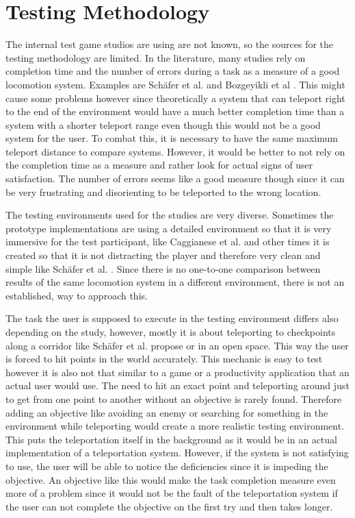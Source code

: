 \section{Testing Methodology}
The internal test game studios are using are not known, so the sources for the testing methodology are limited. In the literature, many studies rely on completion time and the number of errors during a task as a measure of a good locomotion system. Examples are Schäfer et al. \cite{Schafer2021} and Bozgeyikli et al \cite{bozgeyikli}.
This might cause some problems however since theoretically a system that can teleport right to the end of the environment would have a much better completion time than a system with a shorter teleport range even though this would not be a good system for the user. To combat this, it is necessary to have the same maximum teleport distance to compare systems. However, it would be better to not rely on the completion time as a measure and rather look for actual signs of user satisfaction. The number of errors seems like a good measure though since it can be very frustrating and disorienting to be teleported to the wrong location. 

The testing environments used for the studies are very diverse. Sometimes the prototype implementations are using a detailed environment so that it is very immersive for the test participant, like Caggianese et al. \cite{Caggianese} and other times it is created so that it is not distracting the player and therefore very clean and simple like Schäfer et al. \cite{Schafer2021}.  
Since there is no one-to-one comparison between results of the same locomotion system in a different environment, there is not an established, way to approach this.

The task the user is supposed to execute in the testing environment differs also depending on the study, however, mostly it is about teleporting to checkpoints along a corridor like Schäfer et al. \cite{Schafer2021} propose or in an open space.
This way the user is forced to hit points in the world accurately. This mechanic is easy to test however it is also not that similar to a game or a productivity application that an actual user would use. The need to hit an exact point and teleporting around just to get from one point to another without an objective is rarely found. Therefore adding an objective like avoiding an enemy or searching for something in the environment while teleporting would create a more realistic testing environment. This puts the teleportation itself in the background as it would be in an actual implementation of a teleportation system. However, if the system is not satisfying to use, the user will be able to notice the deficiencies since it is impeding the objective. An objective like this would make the task completion measure even more of a problem since it would not be the fault of the teleportation system if the user can not complete the objective on the first try and then takes longer. 

